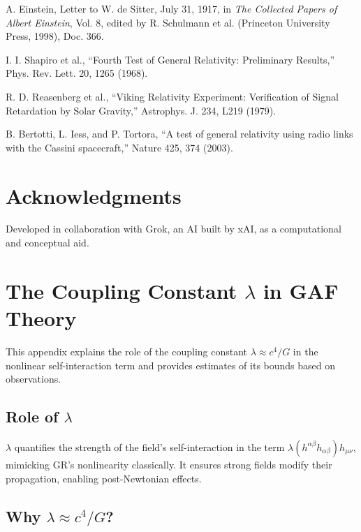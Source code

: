 \documentclass{article}
\begin{document}
\begin{thebibliography}{9}
A. Einstein, Letter to W. de Sitter, July 31, 1917, in \textit{The Collected Papers of Albert Einstein}, Vol. 8, edited by R. Schulmann et al. (Princeton University Press, 1998), Doc. 366.

I. I. Shapiro et al., ``Fourth Test of General Relativity: Preliminary Results,'' Phys. Rev. Lett. 20, 1265 (1968).

R. D. Reasenberg et al., ``Viking Relativity Experiment: Verification of Signal Retardation by Solar Gravity,'' Astrophys. J. 234, L219 (1979).

B. Bertotti, L. Iess, and P. Tortora, ``A test of general relativity using radio links with the Cassini spacecraft,'' Nature 425, 374 (2003).

\end{thebibliography}

\section{Acknowledgments}

Developed in collaboration with Grok, an AI built by xAI, as a computational and conceptual aid.

\appendix

\section{The Coupling Constant \(\lambda\) in GAF Theory}

This appendix explains the role of the coupling constant \(\lambda \approx c^4 / G\) in the nonlinear self-interaction term and provides estimates of its bounds based on observations.

\subsection{Role of \(\lambda\)}

\(\lambda\) quantifies the strength of the field's self-interaction in the term \(\lambda (h^{\alpha\beta} h_{\alpha\beta}) h_{\mu\nu}\), mimicking GR's nonlinearity classically. It ensures strong fields modify their propagation, enabling post-Newtonian effects.

\subsection{Why \(\lambda \approx c^4 / G\)?}
\end{document}
